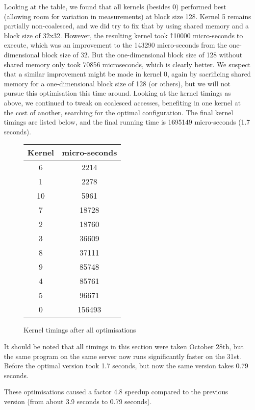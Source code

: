 Looking at the table, we found that all kernels (besides 0) performed best (allowing room for variation in measurements) at block size 128.\n
Kernel 5 remains partially non-coalesced, and we did try to fix that by using shared memory and a block size of 32x32. However, the resulting kernel took \~110000 micro-seconds to execute, which was an improvement to the 143290 micro-seconds from the one-dimensional block size of 32. But the one-dimensional block size of 128 without shared memory only took 70856 microseconds, which is clearly better.\n
We suspect that a similar improvement might be made in kernel 0, again by sacrificing shared memory for a one-dimensional block size of 128 (or others), but we will not pursue this optimisation this time around.\n
Looking at the kernel timings as above, we continued to tweak on coalesced accesses, benefiting in one kernel at the cost of another, searching for the optimal configuration.\n
The final kernel timings are listed below, and the final running time is 1695149 micro-seconds (1.7 seconds).\n


\begin{figure}[H]
    \centering
\begin{tabular}{| c | c |}
    \hline
Kernel & micro-seconds \\
    \hline
6  & 2214 \\
1  & 2278 \\
10 & 5961 \\
7  & 18728 \\
2  & 18760 \\
3  & 36609 \\
8  & 37111 \\
9  & 85748 \\
4  & 85761 \\
5  & 96671 \\
0  & 156493 \\
    \hline
\end{tabular}
\caption{Kernel timings after all optimisations}
\end{figure}

It should be noted that all timings in this section were taken October 28th, but the same program on the same server now runs significantly faster on the 31st. Before the optimal version took 1.7 seconds, but now the same version takes 0.79 seconds.\n

These optimisations caused a factor 4.8 speedup compared to the previous version (from about 3.9 seconds to 0.79 seconds).


